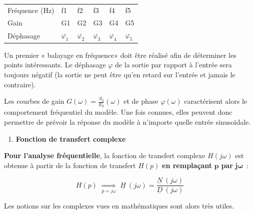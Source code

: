 \begin{longtable}[]{@{}
  >{\raggedright\arraybackslash}p{}
  >{\raggedright\arraybackslash}p{}
  >{\raggedright\arraybackslash}p{}
  >{\raggedright\arraybackslash}p{}
  >{\raggedright\arraybackslash}p{}
  >{\raggedright\arraybackslash}p{}@{}}
\toprule\noalign{}
\endhead
\bottomrule\noalign{}
\endlastfoot
Fréquence (Hz) & f1 & f2 & f3 & f4 & f5 \\
Gain & G1 & G2 & G3 & G4 & G5 \\
Déphasage & \(\varphi_{1}\) & \(\varphi_{2}\) & \(\varphi_{3}\) & \(\varphi_{4}\) & \(\varphi_{5}\) \\
\end{longtable}

Un premier « balayage en fréquence» doit être réalisé afin de déterminer les points intéressants. Le déphasage \(\varphi\) de la sortie par rapport à l'entrée sera toujours négatif (la sortie ne peut être qu'en retard sur l'entrée et jamais le contraire).

Les courbes de gain \(G(\omega) = \frac{S_{0}}{E_{0}}(\omega)\) et de phase \(\varphi(\omega)\) caractérisent alors le comportement fréquentiel du modèle. Une fois connues, elles peuvent donc permettre de prévoir la réponse du modèle à n'importe quelle entrée sinusoïdale.

\begin{enumerate}
\def\labelenumi{\arabic{enumi}.}
\setcounter{enumi}{2}
\item
  \protect\hypertarget{mod-_Toc387521156}{}{}\textbf{Fonction de transfert complexe}
\end{enumerate}

\textbf{Pour l'analyse fréquentielle}, la fonction de transfert complexe \(H(j\omega)\) est obtenue à partir de la fonction de transfert \(H(p)\) \textbf{en remplaçant} \(\mathbf{p}\) \textbf{par} \(\mathbf{j\omega}\)~:

\[H(p)\mspace{6mu}\underset{p = j\omega}{\Rightarrow}\mspace{6mu}\underline{H}\ (j\omega) = \frac{\underline{N}\ (j\omega)}{\underline{D}\ (j\omega)}\]

Les notions sur les complexes vues en mathématiques sont alors très utiles.

